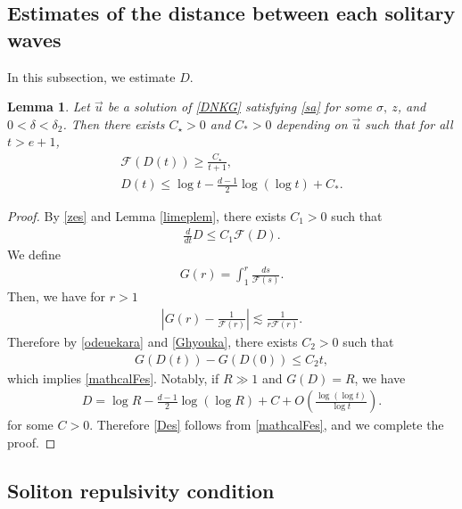 \documentclass[reqno]{amsart}
\theoremstyle{plain}
\newtheorem{lemma}[theorem]{Lemma}
\theoremstyle{definition}
\numberwithin{equation}{section}
\newcommand{\1}{\mathbbm{1}}
\begin{document}
\subsection{Estimates of the distance between each solitary waves}

In this subsection, we estimate $D$. 


\begin{lemma}\label{Dupperbound}
Let $\vec{u}$ be a solution of \eqref{DNKG} satisfying \eqref{sa} for some $\sigma,\ z$, and $0<\delta<\delta_2$. Then there exists $C_{\star}>0$ and $C_{\ast}>0$ depending on $\vec{u}$ such that for all $t>e+1$, 
\begin{align}
\mathcal{F}(D(t))\geq \frac{C_{\star}}{t+1}, \label{mathcalFes}
\\
D(t)\leq \log{t}-\frac{d-1}{2}\log{(\log{t})}+C_{\ast}. \label{Des}
\end{align}
\end{lemma}
\begin{proof}
By \eqref{zes} and Lemma \ref{limeplem}, there exists $C_1>0$ such that 
\begin{align}\label{odeuekara}
\frac{d}{dt}D\leq C_1\mathcal{F}(D).
\end{align}
We define 
\begin{align*}
G(r)=\int_1^r \frac{ds}{\mathcal{F}(s)}.
\end{align*}
Then, we have for $r>1$
\begin{align}\label{Ghyouka}
\left|G(r)-\frac{1}{\mathcal{F}(r)}\right|\lesssim \frac{1}{r\mathcal{F}(r)}.
\end{align}
Therefore by \eqref{odeuekara} and \eqref{Ghyouka}, there exists $C_2>0$ such that
\begin{align*}
G(D(t))-G(D(0))\leq C_2t,
\end{align*}
which implies \eqref{mathcalFes}. Notably, if $R\gg1$ and $G(D)=R$, we have
\begin{align*}
D=\log{R}-\frac{d-1}{2}\log{(\log{R})}+C+O\left(\frac{\log{(\log{t})}}{\log{t}}\right).
\end{align*}
for some $C>0$. Therefore \eqref{Des} follows from \eqref{mathcalFes}, and we complete the proof.
\end{proof}






\subsection{Soliton repulsivity condition}
\end{document}
